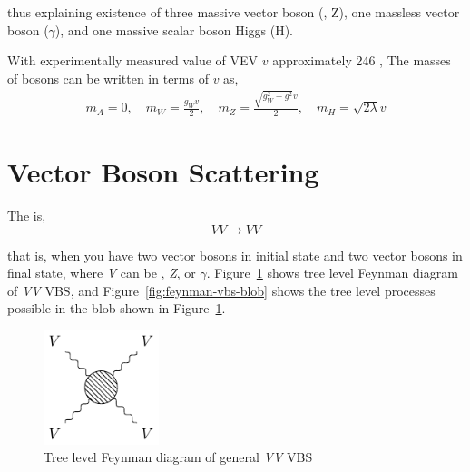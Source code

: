 thus explaining existence of three massive vector boson (\Wplusminus{}, Z), one massless
vector boson (\( \gamma \)), and one massive scalar boson Higgs (H).

With experimentally measured value of \gls{VEV} \( v \) approximately 246 \GeV{},
The masses of bosons can be written in terms of \( v \) as,
%
\begin{align}
  m_A = 0, \quad
  m_W = \frac{g_{W} v}{2}, \quad
  m_Z = \frac{\sqrt{g^{2}_{W} + g^{2}} v }{2}, \quad
  m_H = \sqrt{2\lambda} v
\end{align}

\section{
  Vector Boson Scattering
 }\label{ch_intro:vbs}

The  is,
%
\begin{equation}
  VV \rightarrow VV
\end{equation}

that is, when you have two vector bosons in initial state and two vector
bosons in final state, where \textit{V} can be \Wplusminus{}, \textit{Z}, or \( \gamma \).
Figure~\ref{fig:feynman-vbs-general} shows tree level Feynman diagram
of \textit{VV} \gls{VBS}, and Figure~\ref{fig:feynman-vbs-blob} shows
the tree level processes possible in the blob shown in Figure~\ref{fig:feynman-vbs-general}.

\begin{figure}[!ht]
  \centering
  \includegraphics[width=0.3\textwidth]{figures/feyn_vbs_general.pdf}
  \caption[Tree level Feynman diagram of general \textit{VV} \gls{VBS}]%
  {Tree level Feynman diagram of general \textit{VV} \gls{VBS}}%
  \label{fig:feynman-vbs-general}
\end{figure}

